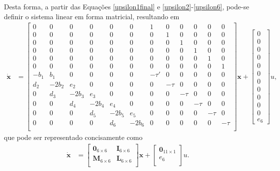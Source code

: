   Desta forma, a partir das Equações \ref{upsilon1final} e \ref{upsilon2}-\ref{upsilon6}, pode-se definir o sistema linear em forma matricial, resultando em \begin{align}
 	\mathbf{\dot{x}} &= \left[\begin{array}{cccccccccccc}
 		0 & 0 & 0 & 0 & 0 & 0 & 1 & 0 & 0 & 0 & 0 & 0\\
 		0 & 0 & 0 & 0 & 0 & 0 & 0 & 1 & 0 & 0 & 0 & 0\\
 		0 & 0 & 0 & 0 & 0 & 0 & 0 & 0 & 1 & 0 & 0 & 0\\
 		0 & 0 & 0 & 0 & 0 & 0 & 0 & 0 & 0 & 1 & 0 & 0\\
 		0 & 0 & 0 & 0 & 0 & 0 & 0 & 0 & 0 & 0 & 1 & 0\\
 		0 & 0 & 0 & 0 & 0 & 0 & 0 & 0 & 0 & 0 & 0 & 1\\
 		-b_1 & b_1 & 0 & 0 & 0 & 0 & -\tau' & 0     & 0 & 0 & 0 & 0\\
 		d_2 & -2b_2  & e_2  & 0  & 0 & 0 &  0    & -\tau & 0 & 0 & 0 & 0\\
 		0 & d_3 & -2b_3  & e_3  & 0  & 0 & 0 &  0    & -\tau & 0 & 0 & 0\\
 		0 & 0 & d_4 & -2b_4  & e_4  & 0  & 0 & 0 &  0    & -\tau & 0 & 0\\
 		0 & 0 & 0 & d_5 & -2b_5  & e_5  & 0  & 0 & 0 &  0    & -\tau & 0\\
 		0 & 0 & 0 & 0 & d_6 & -2b_6  & 0  & 0 & 0 &  0    & 0   &-\tau\\
 	\end{array}\right]\mathbf{x} + \left[\begin{array}{c}
	0\\	0\\	0\\	0\\	0\\ 0\\ 0\\ 0\\ 0\\ 0\\ 0\\ e_6
\end{array}
\right]u,
 \end{align} que pode ser representado concisamente como \begin{align}
 	\mathbf{\dot{x}} &= \left[\begin{array}{cc}
	\mathbf{0}_{6\times 6} & \mathbf{I}_{6\times 6}\\
	\mathbf{M}_{6\times 6} & \mathbf{L}_{6\times 6}\\
\end{array}\right] \mathbf{x} + \left[\begin{array}{c}
	\mathbf{0}_{11\times 1}\\ e_6\\
\end{array} \right]u.
 \end{align}

